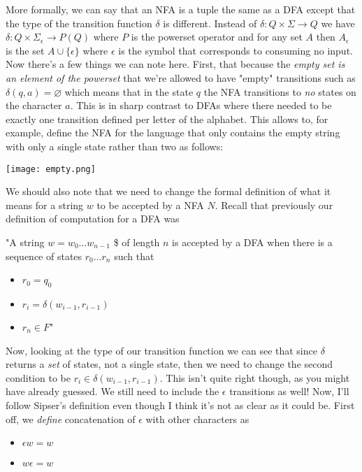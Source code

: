 \documentclass[11pt]{article}
\begin{document}
More formally, we can say that an NFA is a tuple the same as a DFA except that the type of the transition function $\delta$ is different. Instead of $\delta : Q \times \Sigma \to Q$ we have $\delta : Q \times \Sigma_{\epsilon} \to P(Q)$ where $P$ is the powerset operator and for any set $A$ then $A_{\epsilon}$ is the set $A \cup \{\epsilon\}$ where $\epsilon$ is the symbol that corresponds to consuming no input. Now there's a few things we can note here. First, that because the \emph{empty set is an element of the powerset} that we're allowed to have "empty" transitions such as $\delta(q,a) = \varnothing$ which means that in the state $q$ the NFA transitions to \emph{no} states on the character $a$. This is in sharp contrast to DFAs where there needed to be exactly one transition defined per letter of the alphabet. This allows to, for example, define the NFA for the language that only contains the empty string with only a single state rather than two as follows:

\texttt{[image: empty.png]}

We should also note that we need to change the formal definition of what it means for a string $w$ to be accepted by a NFA $N$. Recall that previously our definition of computation for a DFA was 

"A string $w = w_0 \ldots w_{n-1}$ \$ of length $n$ is accepted by a DFA when there is a sequence of states $r_0 \ldots r_n$ such that 
\begin{itemize}
\item $r_0 = q_0$
\item $r_i = \delta (w_{i-1},r_{i-1})$
\item $r_n \in F$"
\end{itemize}

Now, looking at the type of our transition function we can see that since $\delta$ returns a \emph{set} of states, not a single state, then we need to change the second condition to be $r_i \in \delta (w_{i-1},r_{i-1})$. This isn't quite right though, as you might have already guessed. We still need to include the $\epsilon$ transitions as well! Now, I'll follow Sipser's definition even though I think it's not as clear as it could be. First off, we \emph{define} concatenation of $\epsilon$ with other characters as

\begin{itemize}
\item $\epsilon w = w$
\item $w \epsilon = w$
\end{itemize}
\end{document}
